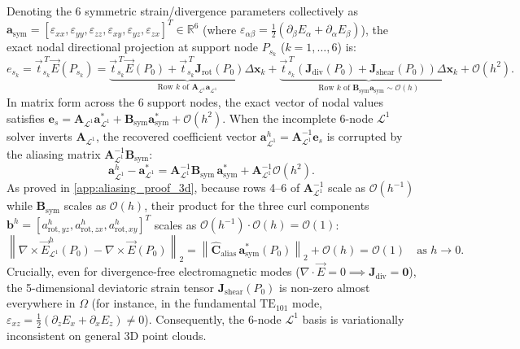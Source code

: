 \documentclass[preprint,12pt]{elsarticle}
\newcommand{\curl}{\nabla \times}
\newcommand{\divg}{\nabla \cdot}
\newcommand{\R}{\mathbb{R}}
\begin{document}
Denoting the 6 symmetric strain/divergence parameters collectively as $\mathbf{a}_{\text{sym}} = [\varepsilon_{xx}, \varepsilon_{yy}, \varepsilon_{zz}, \varepsilon_{xy}, \varepsilon_{yz}, \varepsilon_{zx}]^T \in \R^6$ (where $\varepsilon_{\alpha\beta} = \frac{1}{2}(\partial_\beta E_\alpha + \partial_\alpha E_\beta)$), the exact nodal directional projection at support node $P_{s_k}$ ($k=1,\dots,6$) is:
\begin{equation}
    e_{s_k} = \vec{t}_{s_k}^{\,T}\vec{E}(P_{s_k}) = \underbrace{\vec{t}_{s_k}^{\,T}\vec{E}(P_0) + \vec{t}_{s_k}^{\,T}\mathbf{J}_{\text{rot}}(P_0)\Delta\mathbf{x}_k}_{\text{Row } k \text{ of } \mathbf{A}_{\mathcal{L}^1}\mathbf{a}_{\mathcal{L}^1}} + \underbrace{\vec{t}_{s_k}^{\,T}\left(\mathbf{J}_{\text{div}}(P_0) + \mathbf{J}_{\text{shear}}(P_0)\right)\Delta\mathbf{x}_k}_{\text{Row } k \text{ of } \mathbf{B}_{\text{sym}}\mathbf{a}_{\text{sym}} \sim \mathcal{O}(h)} + \mathcal{O}(h^2).
    \label{eq:nodal_projection_aliasing_3d}
\end{equation}
In matrix form across the 6 support nodes, the exact vector of nodal values satisfies $\mathbf{e}_s = \mathbf{A}_{\mathcal{L}^1}\mathbf{a}_{\mathcal{L}^1}^* + \mathbf{B}_{\text{sym}}\mathbf{a}_{\text{sym}}^* + \mathcal{O}(h^2)$. When the incomplete 6-node $\mathcal{L}^1$ solver inverts $\mathbf{A}_{\mathcal{L}^1}$, the recovered coefficient vector $\mathbf{a}_{\mathcal{L}^1}^h = \mathbf{A}_{\mathcal{L}^1}^{-1}\mathbf{e}_s$ is corrupted by the aliasing matrix $\mathbf{A}_{\mathcal{L}^1}^{-1}\mathbf{B}_{\text{sym}}$:
\begin{equation}
    \mathbf{a}_{\mathcal{L}^1}^h - \mathbf{a}_{\mathcal{L}^1}^* = \mathbf{A}_{\mathcal{L}^1}^{-1} \mathbf{B}_{\text{sym}}\,\mathbf{a}_{\text{sym}}^* + \mathbf{A}_{\mathcal{L}^1}^{-1}\mathcal{O}(h^2).
    \label{eq:aliasing_equation_3d}
\end{equation}
As proved in \ref{app:aliasing_proof_3d}, because rows 4--6 of $\mathbf{A}_{\mathcal{L}^1}^{-1}$ scale as $\mathcal{O}(h^{-1})$ while $\mathbf{B}_{\text{sym}}$ scales as $\mathcal{O}(h)$, their product for the three curl components $\mathbf{b}^h = [a_{\text{rot},yz}^h, a_{\text{rot},zx}^h, a_{\text{rot},xy}^h]^T$ scales as $\mathcal{O}(h^{-1}) \cdot \mathcal{O}(h) = \mathcal{O}(1)$:
\begin{equation}
    \left\| \curl\vec{E}^h_{\mathcal{L}^1}(P_0) - \curl\vec{E}(P_0) \right\|_2 = \left\| \widehat{\mathbf{C}}_{\text{alias}}\,\mathbf{a}_{\text{sym}}^*(P_0) \right\|_2 + \mathcal{O}(h) = \mathcal{O}(1) \quad \text{as } h \to 0.
    \label{eq:curl_stagnation_3d}
\end{equation}
Crucially, even for divergence-free electromagnetic modes ($\divg\vec{E} = 0 \implies \mathbf{J}_{\text{div}} = \mathbf{0}$), the 5-dimensional deviatoric strain tensor $\mathbf{J}_{\text{shear}}(P_0)$ is non-zero almost everywhere in $\Omega$ (for instance, in the fundamental $\text{TE}_{101}$ mode, $\varepsilon_{xz} = \frac{1}{2}(\partial_z E_x + \partial_x E_z) \neq 0$). Consequently, the 6-node $\mathcal{L}^1$ basis is variationally inconsistent on general 3D point clouds.
\end{document}
